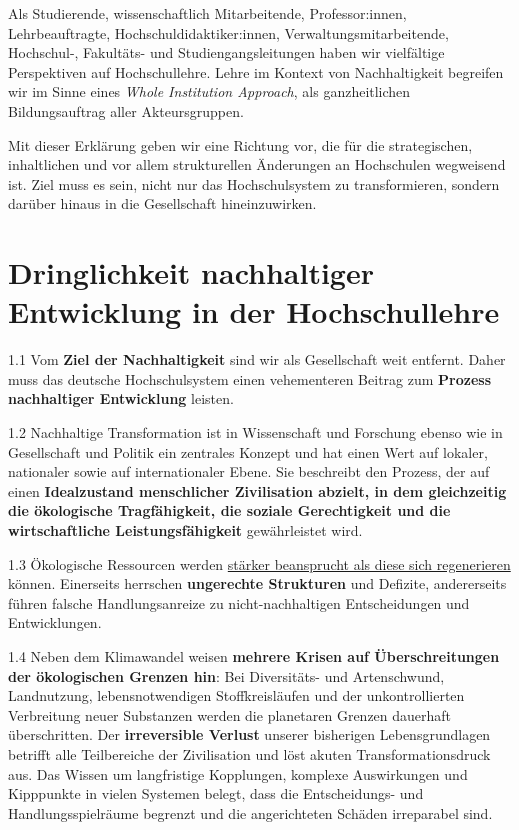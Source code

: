 \documentclass[DIV=12]{scrartcl}
\begin{document}
Als Studierende, wissenschaftlich Mitarbeitende, Professor:innen,
Lehrbeauftragte, Hochschuldidaktiker:innen, Verwaltungsmitarbeitende,
Hochschul-, Fakultäts- und Studiengangsleitungen haben wir vielfältige
Perspektiven auf Hochschullehre. Lehre im Kontext von Nachhaltigkeit
begreifen wir im Sinne eines \emph{Whole Institution Approach}, als
ganzheitlichen Bildungsauftrag aller Akteursgruppen.

Mit dieser Erklärung geben wir eine Richtung vor, die für die
strategischen, inhaltlichen und vor allem strukturellen Änderungen an
Hochschulen wegweisend ist. Ziel muss es sein, nicht nur das
Hochschulsystem zu transformieren, sondern darüber hinaus in die
Gesellschaft hineinzuwirken.

\hypertarget{dringlichkeit-nachhaltiger-entwicklung-in-der-hochschullehre}{%
\section{Dringlichkeit nachhaltiger Entwicklung in der
Hochschullehre}\label{dringlichkeit-nachhaltiger-entwicklung-in-der-hochschullehre}}

1.1 Vom \textbf{Ziel der Nachhaltigkeit} sind wir als Gesellschaft weit
entfernt. Daher muss das deutsche Hochschulsystem einen vehementeren
Beitrag zum \textbf{Prozess nachhaltiger Entwicklung} leisten.

1.2 Nachhaltige Transformation ist in Wissenschaft und Forschung ebenso
wie in Gesellschaft und Politik ein zentrales Konzept und hat einen Wert
auf lokaler, nationaler sowie auf internationaler Ebene. Sie beschreibt
den Prozess, der auf einen \textbf{Idealzustand menschlicher
Zivilisation abzielt, in dem gleichzeitig die ökologische Tragfähigkeit,
die soziale Gerechtigkeit und die wirtschaftliche Leistungsfähigkeit}
gewährleistet wird.

1.3 Ökologische Ressourcen werden
\href{https://www.stockholmresilience.org/research/planetary-boundaries.html}{stärker
beansprucht als diese sich regenerieren} können. Einerseits herrschen
\textbf{ungerechte Strukturen} und Defizite, andererseits führen falsche
Handlungsanreize zu nicht-nachhaltigen Entscheidungen und Entwicklungen.

1.4 Neben dem Klimawandel weisen \textbf{mehrere Krisen auf
Überschreitungen der ökologischen Grenzen hin}: Bei Diversitäts- und
Artenschwund, Landnutzung, lebensnotwendigen Stoffkreisläufen und der
unkontrollierten Verbreitung neuer Substanzen werden die planetaren
Grenzen dauerhaft überschritten. Der \textbf{irreversible Verlust}
unserer bisherigen Lebensgrundlagen betrifft alle Teilbereiche der
Zivilisation und löst akuten Transformationsdruck aus. Das Wissen um
langfristige Kopplungen, komplexe Auswirkungen und Kipppunkte in vielen
Systemen belegt, dass die Entscheidungs- und Handlungsspielräume
begrenzt und die angerichteten Schäden irreparabel sind.
\end{document}
